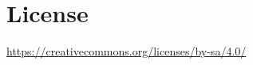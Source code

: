 \section*{License}
\label{s:license}
\begin{center}
	\url{https://creativecommons.org/licenses/by-sa/4.0/}
\end{center}
